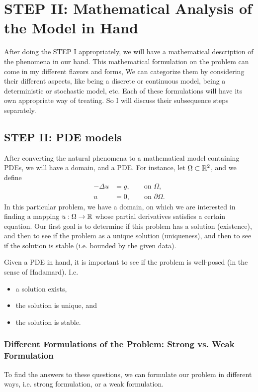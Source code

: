 \FloatBarrier

\section{STEP II: Mathematical Analysis of the Model in Hand}
After doing the STEP I appropriately, we will have a mathematical description of the phenomena in our hand. This mathematical formulation on the problem can come in my different flavors and forms, We can categorize them by considering their different aspects, like being a discrete or continuous model, being a deterministic or stochastic model, etc. Each of these formulations will have its own appropriate way of treating. So I will discuss their subsequence steps separately.
 
 
\subsection{STEP II: PDE models}
After converting the natural phenomena to a mathematical model containing PDEs, we will have a domain, and a PDE. For instance, let $ \Omega \subset \mathbb{R}^2 $, and we define
\begin{align*}
	-\Delta u  &= g, \qquad \text{on }\Omega, \\
	u &= 0, \qquad \text{on } \partial \Omega.
\end{align*}
In this particular problem, we have a domain, on which we are interested in finding a mapping $ u:\Omega \to \mathbb{R} $ whose partial derivatives satisfies a certain equation. Our first goal is to determine if this problem has a solution (existence), and then to see if the problem as a unique solution (uniqueness), and then to see if the solution is stable (i.e. bounded by the given data). 

\begin{summary}
	Given a PDE in hand, it is important to see if the problem is well-posed (in the sense  of Hadamard). I.e.
	\begin{itemize}[noitemsep]
		\item a solution exists,
		\item the solution is unique, and
		\item the solution is stable.
		
	\end{itemize}
\end{summary}

\subsubsection{Different Formulations of the Problem: Strong vs. Weak Formulation}
To find the answers to these questions, we can formulate our problem in different ways, i.e. strong formulation, or a weak formulation. 